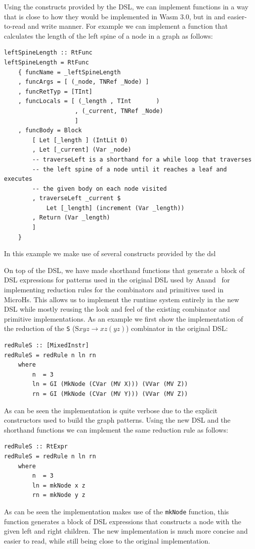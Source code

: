 Using the constructs provided by the DSL, we can implement functions in a way that is close to how they would be implemented in Wasm 3.0, but in and easier-to-read and write manner. For example we can implement a function that calculates the length of the left spine of a node in a graph as follows:
\begin{verbatim}
leftSpineLength :: RtFunc
leftSpineLength = RtFunc
    { funcName = _leftSpineLength
    , funcArgs = [ (_node, TNRef _Node) ]
    , funcRetTyp = [TInt]
    , funcLocals = [ (_length , TInt       )
                    , (_current, TNRef _Node)
                    ]
    , funcBody = Block
        [ Let [_length ] (IntLit 0)
        , Let [_current] (Var _node)
        -- traverseLeft is a shorthand for a while loop that traverses
        -- the left spine of a node until it reaches a leaf and executes
        -- the given body on each node visited
        , traverseLeft _current $ 
            Let [_length] (increment (Var _length))
        , Return (Var _length)
        ]
    }
\end{verbatim}
In this example we make use of several constructs provided by the dsl 

On top of the DSL, we have made shorthand functions that generate a block of DSL expressions for patterns used in the original DSL used by Anand~\cite{anandthesis} for implementing reduction rules for the combinators and primitives used in MicroHs. This allows us to implement the runtime system entirely in the new DSL while mostly reusing the look and feel of the existing combinator and primitive implementations. As an example we first show the implementation of the reduction of the \verb|S| ($\text{S} x y z \rightarrow x z (yz)$) combinator in the original DSL:
\begin{verbatim}
redRuleS :: [MixedInstr]
redRuleS = redRule n ln rn
    where
        n  = 3
        ln = GI (MkNode (CVar (MV X))) (VVar (MV Z))
        rn = GI (MkNode (CVar (MV Y))) (VVar (MV Z))
\end{verbatim}
As can be seen the implementation is quite verbose due to the explicit constructors used to build the graph patterns. Using the new DSL and the shorthand functions we can implement the same reduction rule as follows:
\begin{verbatim}
redRuleS :: RtExpr
redRuleS = redRule n ln rn
    where
        n  = 3
        ln = mkNode x z
        rn = mkNode y z
\end{verbatim}
As can be seen the implementation makes use of the \verb|mkNode| function, this function generates a block of DSL expressions that constructs a node with the given left and right children. The new implementation is much more concise and easier to read, while still being close to the original implementation.

